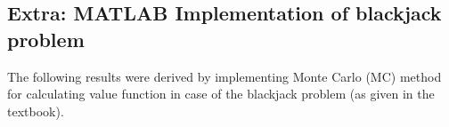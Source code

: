 \documentclass[10pt]{article}
\begin{document}
 	\subsection*{Extra: MATLAB Implementation of blackjack problem}
 	\label{ex:blackjack}
 	The following results were derived by implementing Monte Carlo (MC) method for calculating value function in case of the blackjack problem (as given in the textbook).
 	 \begin{figure}[H]
 	 	\centering
 		\begin{subfigure}{0.45\textwidth}
 		\end{subfigure}
 		\begin{subfigure}{0.45\textwidth}

\end{subfigure}
\end{figure}
\end{document}
